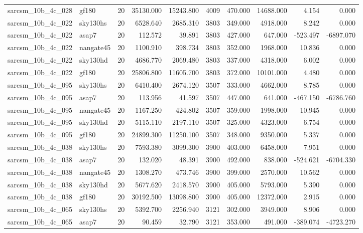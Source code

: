 \documentclass{article}
\begin{document}
\begin{longtable}{llrrrrrrrr}
sarcsm\_10b\_4c\_028 & gf180 & 20 & 35130.000 & 15243.800 & 4009 & 470.000 & 14688.000 & 4.154 & 0.000 \\
sarcsm\_10b\_4c\_022 & sky130hs & 20 & 6528.640 & 2685.310 & 3803 & 349.000 & 4918.000 & 8.242 & 0.000 \\
sarcsm\_10b\_4c\_022 & asap7 & 20 & 112.572 & 39.891 & 3803 & 427.000 & 647.000 & -523.497 & -6897.070 \\
sarcsm\_10b\_4c\_022 & nangate45 & 20 & 1100.910 & 398.734 & 3803 & 352.000 & 1968.000 & 10.836 & 0.000 \\
sarcsm\_10b\_4c\_022 & sky130hd & 20 & 4686.770 & 2069.480 & 3803 & 337.000 & 4318.000 & 6.002 & 0.000 \\
sarcsm\_10b\_4c\_022 & gf180 & 20 & 25806.800 & 11605.700 & 3803 & 372.000 & 10101.000 & 4.480 & 0.000 \\
sarcsm\_10b\_4c\_095 & sky130hs & 20 & 6410.400 & 2674.120 & 3507 & 333.000 & 4662.000 & 8.785 & 0.000 \\
sarcsm\_10b\_4c\_095 & asap7 & 20 & 113.956 & 41.597 & 3507 & 447.000 & 641.000 & -467.150 & -6786.760 \\
sarcsm\_10b\_4c\_095 & nangate45 & 20 & 1167.250 & 424.802 & 3507 & 359.000 & 1998.000 & 10.945 & 0.000 \\
sarcsm\_10b\_4c\_095 & sky130hd & 20 & 5115.110 & 2197.110 & 3507 & 325.000 & 4323.000 & 6.754 & 0.000 \\
sarcsm\_10b\_4c\_095 & gf180 & 20 & 24899.300 & 11250.100 & 3507 & 348.000 & 9350.000 & 5.337 & 0.000 \\
sarcsm\_10b\_4c\_038 & sky130hs & 20 & 7593.380 & 3099.300 & 3900 & 403.000 & 6458.000 & 7.951 & 0.000 \\
sarcsm\_10b\_4c\_038 & asap7 & 20 & 132.020 & 48.391 & 3900 & 492.000 & 838.000 & -524.621 & -6704.330 \\
sarcsm\_10b\_4c\_038 & nangate45 & 20 & 1308.270 & 473.746 & 3900 & 399.000 & 2570.000 & 10.562 & 0.000 \\
sarcsm\_10b\_4c\_038 & sky130hd & 20 & 5677.620 & 2418.570 & 3900 & 405.000 & 5793.000 & 5.390 & 0.000 \\
sarcsm\_10b\_4c\_038 & gf180 & 20 & 30192.500 & 13098.800 & 3900 & 405.000 & 12372.000 & 2.915 & 0.000 \\
sarcsm\_10b\_4c\_065 & sky130hs & 20 & 5392.700 & 2256.940 & 3121 & 302.000 & 3949.000 & 8.906 & 0.000 \\
sarcsm\_10b\_4c\_065 & asap7 & 20 & 90.459 & 32.790 & 3121 & 353.000 & 491.000 & -389.074 & -4723.270 \\

\end{longtable}
\end{document}

